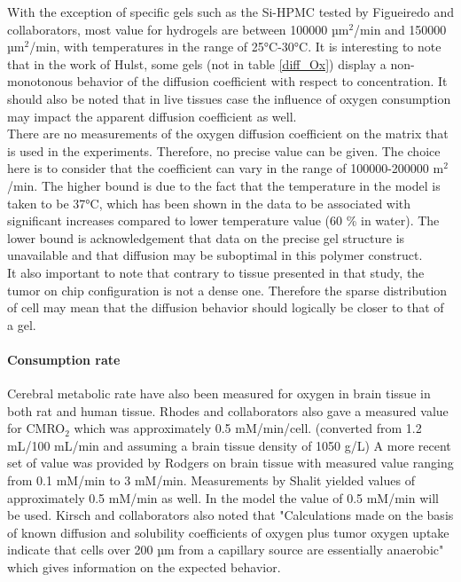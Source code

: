 \documentclass[11pt,a4paper]{article}
\begin{document}
With the exception of specific gels such as the Si-HPMC tested by Figueiredo and collaborators, most value for hydrogels are between 100000 µm$^2$/min and 150000 µm$^2$/min, with temperatures in the range of 25°C-30°C. It is interesting to note that in the work of Hulst, some gels (not in table \ref{diff_Ox}) display a non-monotonous behavior of the diffusion coefficient with respect to concentration.\cite{Hulst1987} It should also be noted that in live tissues case the influence of oxygen consumption may impact the apparent diffusion coefficient as well.\\

There are no measurements of the oxygen diffusion coefficient on the matrix that is used in the experiments. Therefore, no precise value can be given. The choice here is to consider that the coefficient can vary in the range of 100000-200000 \textmu m$^2$/min. The higher bound is due to the fact that the temperature in the model is taken to be 37°C, which has been shown in the data to be associated with significant increases compared to lower temperature value (60 \% in water). The lower bound is acknowledgement that data on the precise gel structure is unavailable and that diffusion may be suboptimal in this polymer construct.\\

It also important to note that contrary to tissue presented in that study, the tumor on chip configuration is not a dense one. Therefore the sparse distribution of cell may mean that the diffusion behavior should logically be closer to that of a gel.

\paragraph{Consumption rate} 
Cerebral metabolic rate have also been measured for oxygen in brain tissue in both rat and human tissue. Rhodes and collaborators also gave a measured value for CMRO$_2$ which was approximately 0.5 mM/min/cell. (converted from 1.2 mL/100 mL/min and assuming a brain tissue density of 1050 g/L) \cite{Rhodes1983} A more recent set of value was provided by Rodgers on brain tissue with measured value ranging from 0.1 mM/min to 3 mM/min. Measurements by Shalit yielded values of approximately 0.5 mM/min as well.\cite{Shalit1972} In the model the value of 0.5 mM/min will be used. Kirsch and collaborators also noted that  "Calculations made on the basis of known diffusion and solubility coefficients of oxygen plus tumor oxygen uptake indicate that cells over 200 µm from a capillary source are essentially anaerobic" which gives information on the expected behavior.\cite{Kirsch1978}\\
\end{document}
